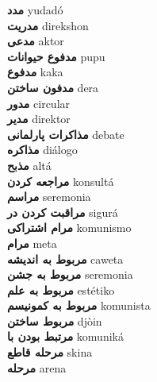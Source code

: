 \textbf{ مدد  } yudadó \\
\textbf{ مدریت  } direkshon \\
\textbf{ مدعی  } aktor \\
\textbf{ مدفوع حیوانات  } pupu \\
\textbf{ مدفوع  } kaka \\
\textbf{ مدفون ساختن  } dera \\
\textbf{ مدور  } circular \\
\textbf{ مدیر  } direktor \\
\textbf{ مذاکرات پارلمانی  } debate \\
\textbf{ مذاکره  } diálogo \\
\textbf{ مذبح  } altá \\
\textbf{ مراجعه کردن  } konsultá \\
\textbf{ مراسم  } seremonia \\
\textbf{ مراقبت کردن در  } sigurá \\
\textbf{ مرام اشتراکی  } komunismo \\
\textbf{ مرام  } meta \\
\textbf{ مربوط به اندیشه  } caweta \\
\textbf{ مربوط به جشن  } seremonia \\
\textbf{ مربوط به علم  } estétiko \\
\textbf{ مربوط به کمونیسم  } komunista \\
\textbf{ مربوط ساختن  } djòin \\
\textbf{ مرتبط بودن با  } komuniká \\
\textbf{ مرحله قاطع  } skina \\
\textbf{ مرحله  } arena \\

